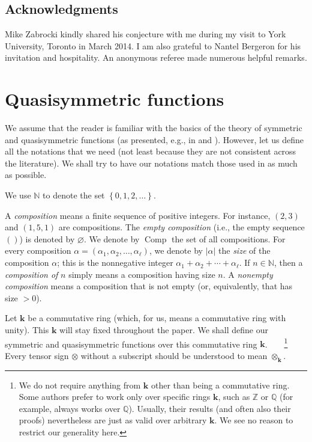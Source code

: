 \documentclass[numbers=enddot,12pt,final,onecolumn,notitlepage,abstracton]{scrartcl}%
\theoremstyle{definition}
\begin{document}
\subsection{Acknowledgments}

Mike Zabrocki kindly shared his conjecture with me during my visit to York
University, Toronto in March 2014. I am also grateful to Nantel Bergeron for
his invitation and hospitality. An anonymous referee made numerous helpful remarks.

\section{\label{sect.qsym}Quasisymmetric functions}

We assume that the reader is familiar with the basics of the theory of
symmetric and quasisymmetric functions (as presented, e.g., in \cite[Chapters
4 and 6]{HGK} and \cite[Chapters 2 and 5]{Reiner}). However, let us define all
the notations that we need (not least because they are not consistent across
the literature). We shall try to have our notations match those used in
\cite[Section 2]{BBSSZ} as much as possible.

We use $\mathbb{N}$ to denote the set $\left\{  0,1,2,\ldots\right\}  $.

A \textit{composition} means a finite sequence of positive integers. For
instance, $\left(  2,3\right)  $ and $\left(  1,5,1\right)  $ are
compositions. The \textit{empty composition} (i.e., the empty sequence
$\left(  {}\right)  $) is denoted by $\varnothing$. We denote by
$\operatorname*{Comp}$ the set of all compositions. For every composition
$\alpha=\left(  \alpha_{1},\alpha_{2},\ldots,\alpha_{\ell}\right)  $, we
denote by $\left\vert \alpha\right\vert $ the \textit{size} of the composition
$\alpha$; this is the nonnegative integer $\alpha_{1}+\alpha_{2}+\cdots
+\alpha_{\ell}$. If $n\in\mathbb{N}$, then a \textit{composition of }$n$
simply means a composition having size $n$. A \textit{nonempty composition}
means a composition that is not empty (or, equivalently, that has size $>0$).

Let $\mathbf{k}$ be a commutative ring (which, for us, means a commutative
ring with unity). This $\mathbf{k}$ will stay fixed throughout the paper. We
shall define our symmetric and quasisymmetric functions over this commutative
ring $\mathbf{k}$.\ \ \ \ \footnote{We do not require anything from
$\mathbf{k}$ other than being a commutative ring. Some authors prefer to work
only over specific rings $\mathbf{k}$, such as $\mathbb{Z}$ or $\mathbb{Q}$
(for example, \cite{BBSSZ} always works over $\mathbb{Q}$). Usually, their
results (and often also their proofs) nevertheless are just as valid over
arbitrary $\mathbf{k}$. We see no reason to restrict our generality here.}
Every tensor sign $\otimes$ without a subscript should be understood to mean
$\otimes_{\mathbf{k}}$.
\end{document}
